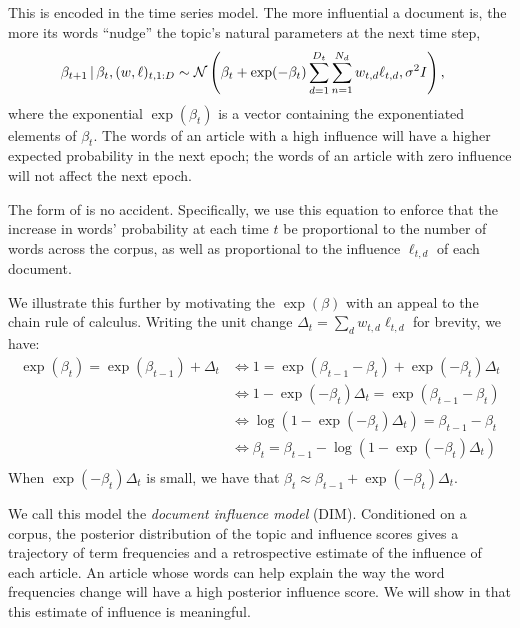 This is encoded in the time series model.  The more influential a
document is, the more its words ``nudge'' the topic's natural
parameters at the next time step,
\begin{equation}
  \begin{split}
    \label{eq:logistic-normal-influence}
    \beta_{t+1} \, | \, & \beta_t, (w, \ell)_{t,1:D} \sim
    \mathcal{N}\left(
      \beta_{t} +
      \exp(-\beta_t) \sum_{d=1}^{D_t} \sum_{n=1}^{N_d} w_{t,d} \ell_{t,d},
      \sigma^2 I
    \right),
  \end{split}
\end{equation}
where the exponential $\exp(\beta_t)$ is a vector containing the
exponentiated elements of $\beta_t$. The words of an article with a
high influence will have a higher expected probability in the next
epoch; the words of an article with zero influence will not affect the
next epoch.

The form of  is no accident.
Specifically, we use this equation to enforce that the increase in
words' probability at each time $t$ be proportional to the number
of words across the corpus, as well as proportional to the
influence $\ell_{t,d}$ of each document.

We illustrate this further by motivating the $\exp(\beta)$ with an
appeal to the chain rule of calculus.  Writing the unit change
$\Delta_t = \sum_d w_{t,d} \ell_{t,d}$ for brevity, we have:
  \begin{align}
    \exp(\beta_t) = \exp(\beta_{t-1}) + \Delta_t \nonumber
    & \iff 1 = \exp(\beta_{t-1} - \beta_{t}) + \exp(-\beta_t) \Delta_t \nonumber \\
    & \iff 1 - \exp(-\beta_t) \Delta_t = \exp(\beta_{t-1} - \beta_{t}) \nonumber \\
    & \iff \log(1 - \exp(-\beta_t) \Delta_t) = \beta_{t-1} - \beta_t \nonumber \\
    & \iff \beta_t = \beta_{t-1} - \log(1 - \exp(-\beta_t) \Delta_t) \nonumber \\
  \end{align}
When $\exp(-\beta_t) \Delta_t$ is small, we have that $\beta_t \approx
\beta_{t-1} + \exp(-\beta_t) \Delta_t$.


We call this model the \textit{document influence model}
(DIM). Conditioned on a corpus, the posterior distribution of the
topic and influence scores gives a trajectory of term frequencies and
a retrospective estimate of the influence of each article.  An article
whose words can help explain the way the word frequencies change will
have a high posterior influence score.  We will show in 
that this estimate of influence is meaningful.

